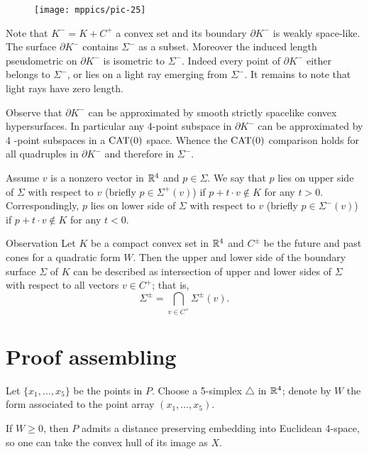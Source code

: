 \documentclass{article}
\begin{document}
\begin{wrapfigure}{r}{60mm}
\vskip-4mm
\centering
\texttt{[image: mppics/pic-25]}
\end{wrapfigure}

Note that $K^-=K+C^+$ a convex set and its boundary $\partial K^-$ is weakly space-like.
The surface $\partial K^-$ contains $\Sigma^-$ as a subset.
Moreover the induced length pseudometric on $\partial K^-$ is isometric to $\Sigma^-$.
Indeed every point of $\partial K^-$ either belongs to  $\Sigma^-$, or lies on a light ray emerging from $\Sigma^-$.
It remains to note that light rays have zero length.

Observe that $\partial K^-$ can be approximated by smooth strictly spacelike convex hypersurfaces.
In particular any 4-point subspace in $\partial K^-$ can be approximated by 4 -point subspaces in a $\mathrm{CAT}(0)$ space.
Whence the $\mathrm{CAT}(0)$ comparison holds for all quadruples in $\partial K^-$ and therefore in $\Sigma^-$.
\qeds




Assume $v$ is a nonzero vector in $\mathbb{R}^4$ and $p\in\Sigma$.
We say that $p$ lies on upper side of $\Sigma$ with respect to $v$ (briefly $p\in \Sigma^+(v)$) if $p+t\cdot v\notin K$ for any $t>0$.
Correspondingly, $p$ lies on lower side of $\Sigma$ with respect to $v$ (briefly $p\in \Sigma^-(v)$) if $p+t\cdot v\notin K$ for any $t<0$.

\begin{thm}{Observation}\label{obs:Sigma(v)}
Let $K$ be a compact convex set in $\mathbb{R}^4$ and $C^\pm$ be the future and past cones for a quadratic form $W$.
Then the upper and lower side of the boundary surface $\Sigma$ of $K$ can be described as intersection of upper and lower sides of $\Sigma$ with respect to all vectors $v\in C^+$;
that is,
\[\Sigma^\pm=\bigcap_{v\in C^+}\Sigma^\pm(v).\]
\end{thm}

\section{Proof assembling}

Let $\{x_1,\dots,x_5\}$ be the points in $P$.
Choose a 5-simplex $\triangle$ in $\mathbb{R}^4$; denote by $W$ the form associated to the point array $(x_1,\dots,x_5)$.

If $W\ge0$, then $P$ admits a distance preserving embedding into Euclidean 4-space, so one can take the convex hull of its image as $X$.
\end{document}
